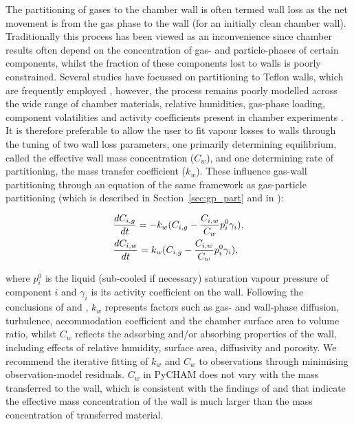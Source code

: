 \documentclass[gmd, manuscript]{copernicus}
\begin{document}
The partitioning of gases to the chamber wall is often termed wall loss as the net movement is from the gas phase to the wall (for an initially clean chamber wall).  Traditionally this process has been viewed as an inconvenience since chamber results often depend on the concentration of gas- and particle-phases of certain components, whilst the fraction of these components lost to walls is poorly constrained.  Several studies have focussed on partitioning to Teflon walls, which are frequently employed \citep{Matsunaga2010, Zhang2015b, Zhao2018}, however, the process remains poorly modelled across the wide range of chamber materials, relative humidities, gas-phase loading, component volatilities and activity coefficients present in chamber experiments \citep[e.g.][]{Day2017, Stefenelli2018}.  It is therefore preferable to allow the user to fit vapour losses to walls through the tuning of two wall loss parameters, one primarily determining equilibrium, called the effective wall mass concentration ($C_w$), and one determining rate of partitioning, the mass transfer coefficient ($k_w$).  These influence gas-wall partitioning through an equation of the same framework as gas-particle partitioning (which is described in Section~\ref{sec:gp_part} and in \citet{Zaveri2008}):

\begin{align} \label{eq:gas_wall_partit}
	&\frac{dC_{i,g}}{dt} = -k_{w}(C_{i,g}-\frac{C_{i,w}}{C_{w}}p^{0}_{i}\gamma_{i})\rm{,}\\
	&\frac{dC_{i,w}}{dt} = k_{w}(C_{i,g}-\frac{C_{i,w}}{C_{w}}p^{0}_{i}\gamma_{i})\rm{,}
\end{align}

where $p^{0}_{i}$ is the liquid (sub-cooled if necessary) saturation vapour pressure of component $i$ and $\gamma_{i}$ is its activity coefficient on the wall.  Following the conclusions of \citet{Matsunaga2010} and \citet{Zhang2015b}, $k_{w}$ represents factors such as gas- and wall-phase diffusion, turbulence, accommodation coefficient and the chamber surface area to volume ratio, whilst $C_{w}$ reflects the adsorbing and/or absorbing properties of the wall, including effects of relative humidity, surface area, diffusivity and porosity.  We recommend the iterative fitting of $k_{w}$ and $C_{w}$ to observations through minimising observation-model residuals.  $C_{w}$ in PyCHAM does not vary with the mass transferred to the wall, which is consistent with the findings of \citet{Matsunaga2010} and \citet{Zhang2015b} that indicate the effective mass concentration of the wall is much larger than the mass concentration of transferred material.
\end{document}
